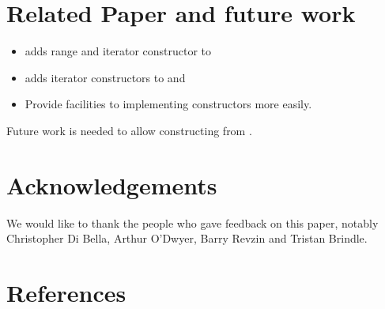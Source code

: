 \documentclass{wg21}
\begin{document}
\section{Related Paper and future work}

\begin{itemize}
	\item {} adds range and iterator constructor to 
    \item \cite{P1425} adds iterator constructors to  and 
    \item \cite{P1419} Provide facilities to implementing  constructors more easily.
\end{itemize}

Future work is needed to allow constructing  from .

\section{Acknowledgements}
We would like to thank the people who gave feedback on this paper, notably Christopher Di Bella, Arthur O'Dwyer, Barry Revzin
and Tristan Brindle.\\

\section{References}
\renewcommand{\section}[2]{}%

\end{document}
